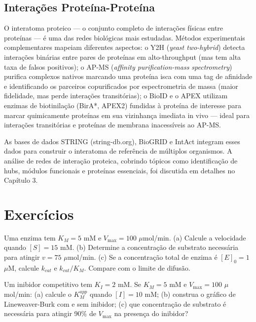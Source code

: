 \subsection{Interações Proteína-Proteína}

O interatoma proteico --- o conjunto completo de interações físicas entre proteínas ---
é uma das redes biológicas mais estudadas. Métodos experimentais complementares
mapeiam diferentes aspectos: o Y2H (\textit{yeast two-hybrid}) detecta interações
binárias entre pares de proteínas em alto-throughput (mas tem alta taxa de falsos
positivos); o AP-MS (\textit{affinity purification-mass spectrometry}) purifica
complexos nativos marcando uma proteína isca com uma tag de afinidade e identificando
os parceiros copurificados por espectrometria de massa (maior fidelidade, mas perde
interações transitórias); o BioID e o APEX utilizam enzimas de biotinilação
(BirA*, APEX2) fundidas à proteína de interesse para marcar quimicamente proteínas
em sua vizinhança imediata in vivo --- ideal para interações transitórias e proteínas
de membrana inacessíveis ao AP-MS.

As bases de dados STRING (string-db.org), BioGRID e IntAct integram esses dados para
construir o interatoma de referência de múltiplos organismos. A análise de redes de
interação proteica, cobrindo tópicos como identificação de hubs, módulos funcionais e
proteínas essenciais, foi discutida em detalhes no Capítulo 3.


\section{Exercícios}

\begin{exercicio}
Uma enzima tem $K_M = 5$ mM e $V_{\max} = 100$ $\mu$mol/min. (a) Calcule a velocidade
quando $[S] = 15$ mM. (b) Determine a concentração de substrato necessária para atingir
$v = 75$ $\mu$mol/min. (c) Se a concentração total de enzima é $[E]_0 = 1$ $\mu$M,
calcule $k_{cat}$ e $k_{cat}/K_M$. Compare com o limite de difusão.
\end{exercicio}

\begin{exercicio}
Um inibidor competitivo tem $K_I = 2$ mM. Se $K_M = 5$ mM e $V_{\max} = 100$ $\mu$mol/min:
(a) calcule o $K_M^{app}$ quando $[I] = 10$ mM; (b) construa o gráfico de Lineweaver-Burk
com e sem inibidor; (c) que concentração de substrato é necessária para atingir 90\% de
$V_{\max}$ na presença do inibidor?
\end{exercicio}

